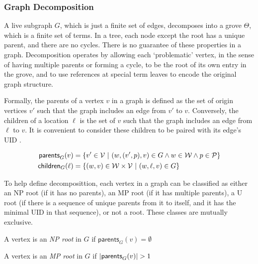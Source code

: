 \subsubsection{Graph Decomposition}%
\label{subsub:Graph Decomposition}

\figureDecompExample

A live subgraph $G$, which is just a finite set of edges, decomposes into a grove $\Theta$, which is a finite set of terms. In a tree, each node except the root has a unique parent, and there are no cycles. There is no guarantee of these properties in a graph. Decomposition operates by allowing each `problematic' vertex, in the sense of having multiple parents or forming a cycle, to be the root of its own entry in the grove, and to use references at special term leaves to encode the original graph structure.

Formally, the parents of a vertex $v$ in a graph is defined as the set of origin vertices $v'$ such that the graph includes an edge from $v'$ to $v$. Conversely, the children of a location $\ell$ is the set of $v$ such that the graph includes an edge from $\ell$ to $v$. It is convenient to consider these children to be paired with its edge's UID . 

\begin{definition}
\begin{align*}
    \mathsf{parents}_{G}(v) &= \left\{v' \in \mathcal{V} ~\vert~(w, (v', p), v) \in G \land w \in \mathcal{W} \land p \in \mathcal{P}\right\}\\
    \mathsf{children}_{G}(\ell) &= \left\{(w,v) \in \mathcal{W}\times\mathcal{V} ~\vert~(w, \ell, v) \in G\right\}
\end{align*}
\end{definition}

To help define decomposittion, each vertex in a graph can be classified as either an NP root (if it has no parents), an MP root (if it has multiple parents), a U root (if there is a sequence of unique parents from it to itself, and it has the minimal UID in that sequence), or not a root. These classes are mutually exclusive.

\begin{definition}
    A vertex is an \textit{NP root} in $G$ if $\mathsf{parents}_{G}(v)=\emptyset$
\end{definition}

\begin{definition}
    A vertex is an \textit{MP root} in $G$ if $\left\lvert\mathsf{parents}_{G}(v)\right\rvert > 1$
\end{definition}

